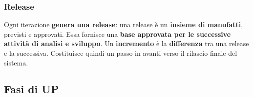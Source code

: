 \documentclass[12pt]{article}
\begin{document}
\subsubsection{Release}
Ogni iterazione \textbf{genera una release}: una release è un \textbf{insieme di manufatti}, previsti e approvati. Essa fornisce una \textbf{base approvata per le successive attività di analisi e sviluppo}.
Un \textbf{incremento} è la \textbf{differenza} tra una release e la successiva. Costituisce quindi un passo in avanti verso il rilascio finale del sistema.
\newpage
\subsection{Fasi di UP}
\end{document}

